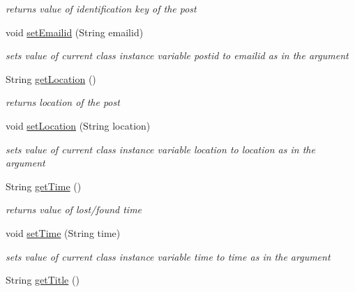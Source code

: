 \begin{DoxyCompactItemize}
\begin{DoxyCompactList}\small\item\em returns value of identification key of the post \end{DoxyCompactList}\item 
void \hyperlink{classcom_1_1example_1_1sel_1_1lostfound_1_1Posts_a0c9abbc2a59af08f0e53f2b82cb4bc47}{set\+Emailid} (String emailid)
\begin{DoxyCompactList}\small\item\em sets value of current class instance variable postid to emailid as in the argument \end{DoxyCompactList}\item 
String \hyperlink{classcom_1_1example_1_1sel_1_1lostfound_1_1Posts_a3ca78a6e83c54589f33938cc3ee6bb0b}{get\+Location} ()\hypertarget{classcom_1_1example_1_1sel_1_1lostfound_1_1Posts_a3ca78a6e83c54589f33938cc3ee6bb0b}{}\label{classcom_1_1example_1_1sel_1_1lostfound_1_1Posts_a3ca78a6e83c54589f33938cc3ee6bb0b}

\begin{DoxyCompactList}\small\item\em returns location of the post \end{DoxyCompactList}\item 
void \hyperlink{classcom_1_1example_1_1sel_1_1lostfound_1_1Posts_aeb555f12a9699a1f20856055e40338a5}{set\+Location} (String location)
\begin{DoxyCompactList}\small\item\em sets value of current class instance variable location to location as in the argument \end{DoxyCompactList}\item 
String \hyperlink{classcom_1_1example_1_1sel_1_1lostfound_1_1Posts_a25287d67ca688f18f480a66abeb83525}{get\+Time} ()\hypertarget{classcom_1_1example_1_1sel_1_1lostfound_1_1Posts_a25287d67ca688f18f480a66abeb83525}{}\label{classcom_1_1example_1_1sel_1_1lostfound_1_1Posts_a25287d67ca688f18f480a66abeb83525}

\begin{DoxyCompactList}\small\item\em returns value of lost/found time \end{DoxyCompactList}\item 
void \hyperlink{classcom_1_1example_1_1sel_1_1lostfound_1_1Posts_aee3490b623adb317e20452d1d7ea6f2f}{set\+Time} (String time)
\begin{DoxyCompactList}\small\item\em sets value of current class instance variable time to time as in the argument \end{DoxyCompactList}\item 
String \hyperlink{classcom_1_1example_1_1sel_1_1lostfound_1_1Posts_afc8f8e5a89b3da692a896055102c45c4}{get\+Title} ()\hypertarget{classcom_1_1example_1_1sel_1_1lostfound_1_1Posts_afc8f8e5a89b3da692a896055102c45c4}{}\label{classcom_1_1example_1_1sel_1_1lostfound_1_1Posts_afc8f8e5a89b3da692a896055102c45c4}


\end{DoxyCompactItemize}
